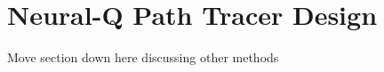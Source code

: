 \documentclass[../dissertation.tex]{subfiles}
\begin{document}
\section{Neural-Q Path Tracer Design}
Move section down here discussing other methods

\begin{comment}

{\bf A topic-specific chapter, of roughly $15$ pages} 
\vspace{1cm} 

\noindent
This chapter is intended to evaluate what you did.  The content is highly 
topic-specific, but for many projects will have flavours of the following:

\begin{enumerate}
\item functional  testing, including analysis and explanation of failure 
      cases,
\item behavioural testing, often including analysis of any results that 
      draw some form of conclusion wrt. the aims and objectives,
      and
\item evaluation of options and decisions within the project, and/or a
      comparison with alternatives.
\end{enumerate}

\noindent
This chapter often acts to differentiate project quality: even if the work
completed is of a high technical quality, critical yet objective evaluation 
and comparison of the outcomes is crucial.  In essence, the reader wants to
learn something, so the worst examples amount to simple statements of fact 
(e.g., ``graph X shows the result is Y''); the best examples are analytical 
and exploratory (e.g., ``graph X shows the result is Y, which means Z; this 
contradicts [1], which may be because I use a different assumption'').  As 
such, both positive {\em and} negative outcomes are valid {\em if} presented 
in a suitable manner.

\subsection{Plan}

\textbf{Data to collect}
\begin{itemize}

\item Build 4 different scenes:

\begin{itemize}
\item Simple geometry, Indirectly illuminated scene: Here both reinforcement learning methods should perform excellently


\end{comment}
\end{document}
